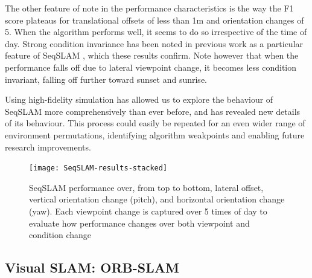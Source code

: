 \documentclass[letterpaper, 10 pt, conference]{ieeeconf}  %
\begin{document}
The other feature of note in the performance characteristics is the way the F1 score plateaus for translational offsets of less than 1m and orientation changes of 5\degree. When the algorithm performs well, it seems to do so irrespective of the time of day. Strong condition invariance has been noted in previous work as a particular feature of SeqSLAM \cite{Milford2012}, which these results confirm. Note however that when the performance falls off due to lateral viewpoint change, it becomes less condition invariant, falling off further toward sunset and sunrise.

Using high-fidelity simulation has allowed us to explore the behaviour of SeqSLAM more comprehensively than ever before, and has revealed new details of its behaviour. This process could easily be repeated for an even wider range of environment permutations, identifying algorithm weakpoints and enabling future research improvements.

\begin{figure}[t]
    \centering
    \texttt{[image: SeqSLAM-results-stacked]}
    \caption{SeqSLAM performance over, from top to bottom, lateral offset, vertical orientation change (pitch), and horizontal orientation change (yaw). Each viewpoint change is captured over 5 times of day to evaluate how performance changes over both viewpoint and condition change}
    \label{fig:seqslam-results-stacked}
\end{figure}




\subsection{Visual SLAM: ORB-SLAM}
\end{document}
